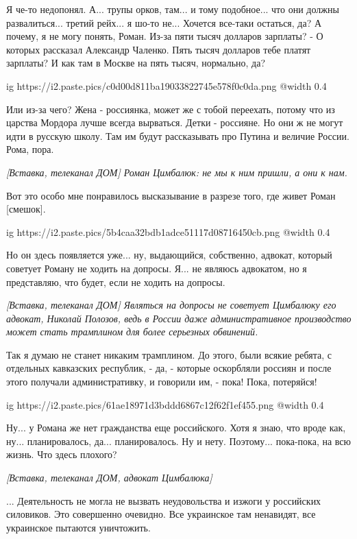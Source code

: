 \begin{multicols}{2}
Я че-то недопонял. А... трупы орков, там... и тому подобное... что они должны
развалиться...  третий рейх... я шо-то не... Хочется все-таки остаться, да? А
почему, я не могу понять, Роман.  Из-за пяти тысяч долларов зарплаты? - О
которых рассказал Александр Чаленко. Пять тысяч долларов тебе платят зарплаты?
И как там в Москве на пять тысяч, нормально, да?

\ifcmt
  ig https://i2.paste.pics/c0d00d811ba19033822745e578f0c0da.png
  @width 0.4
\fi

Или из-за чего? Жена - россиянка, может же с тобой переехать, потому что из царства Мордора
лучше всегда вырваться. Детки - россияне. Но они ж не могут идти в русскую школу. Там им будут рассказывать
про Путина и величие России. Рома, пора. 

{\em\color{blue}
[Вставка, телеканал ДОМ]
Роман Цимбалюк: не мы к ним пришли, а они к нам.
}

Вот это особо мне понравилось высказывание в разрезе того, где живет Роман [смешок].

\ifcmt
  ig https://i2.paste.pics/5b4caa32bdb1adce51117d08716450cb.png
  @width 0.4
\fi

Но он здесь появляется уже... ну, выдающийся, собственно, адвокат,
который советует Роману не ходить на допросы. Я... не являюсь адвокатом,
но я представляю, что будет, если не ходить на допросы. 

{\em\color{blue}
[Вставка, телеканал ДОМ]
Являться на допросы не советует Цимбалюку его адвокат, Николай Полозов, ведь в
России даже административное производство может стать трамплином для более
серьезных обвинений. 
}

Так я думаю не станет никаким трамплином. До этого, были всякие ребята, 
с отдельных кавказских республик, - да, - которые оскорбляли россиян и после этого
получали административку, и говорили им, - пока! Пока, потеряйся!

\ifcmt
  ig https://i2.paste.pics/61ae18971d3bddd6867c12f62f1ef455.png
  @width 0.4
\fi

Ну... у Романа же нет гражданства еще российского. Хотя я знаю, что вроде как, ну...
планировалось, да... планировалось. Ну и нету. Поэтому... пока-пока, на всю жизнь.
Что здесь плохого? 

{\em\color{blue}
[Вставка, телеканал ДОМ, адвокат Цимбалюка]

... Деятельность не могла не вызвать неудовольства и изжоги у российских 
силовиков. Это совершенно очевидно. Все украинское там ненавидят, все украинское 
пытаются уничтожить. 
}


\end{multicols}

